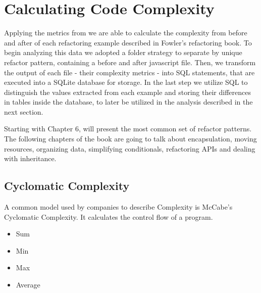 \section{Calculating Code Complexity}

Applying the metrics from \cite{article:mozilla} we are able to calculate the complexity from before and after of each
refactoring example described in Fowler's refactoring book. To begin analyzing this data we adopted a folder strategy to
separate by unique refactor pattern, containing a before and after javascript file. Then, we transform the output of
each file - their complexity metrics - into SQL statements, that are executed into a SQLite database for storage. In the
last step we utilize SQL to distinguish the values extracted from each example and storing their differences in tables
inside the database, to later be utilized in the analysis described in the next section.

Starting with Chapter 6, \cite{book:refactoring} will present the most common set of refactor patterns. The following
chapters of the book are going to talk about encapsulation, moving resources, organizing data, simplifying conditionals,
refactoring APIs and dealing with inheritance.

\subsection{Cyclomatic Complexity}

A common model used by companies to describe Complexity is McCabe's Cyclomatic Complexity. It calculates the control flow of a program.

\begin{itemize}
  \item Sum 
  \item Min 
  \item Max 
  \item Average 
\end{itemize}



